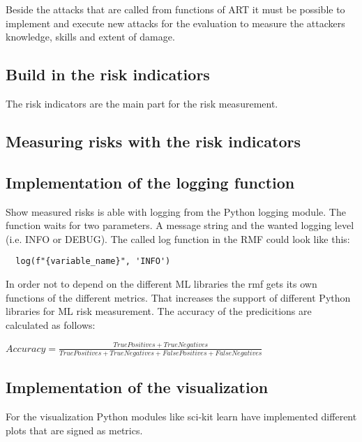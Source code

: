 Beside the attacks that are called from functions of ART it must be possible to implement and execute new attacks for the evaluation to measure the attackers knowledge, skills and extent
of damage.

\subsection{Build in the risk indicatiors}

The risk indicators are the main part for the risk measurement.

\subsection{Measuring risks with the risk indicators}

\subsection{Implementation of the logging function}

Show measured risks is able with logging from the Python logging module. The function waits for two parameters. A message string and the wanted logging level (i.e. INFO or DEBUG). The called log function in the RMF could look like this:
\begin{lstlisting}
  log(f"{variable_name}", 'INFO')
\end{lstlisting}

In order not to depend on the different ML libraries the rmf gets its own functions of the different metrics. That increases the support of different Python libraries for ML risk
measurement. The accuracy of the predicitions are calculated as follows: \\
\begin{center}
  $Accuracy = \frac{True Positives + True Negatives}{True Positives + True Negatives + False Positives + False Negatives}$
\end{center}

\subsection{Implementation of the visualization}

For the visualization Python modules like sci-kit learn have implemented different plots that are signed as metrics.
